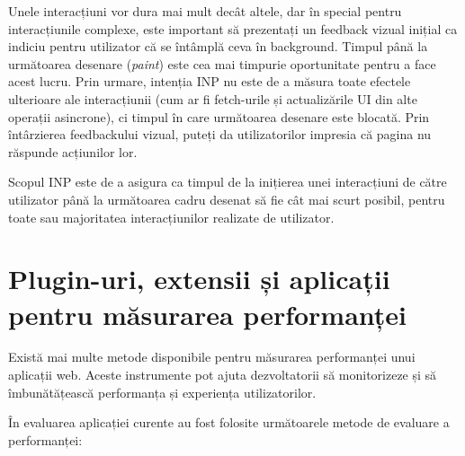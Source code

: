 \documentclass[12pt, a4paper]{report}
\begin{document}
\begin{itemize}
	      Unele interacțiuni vor dura mai mult decât altele, dar în special pentru interacțiunile complexe, este important să prezentați un feedback vizual inițial ca indiciu pentru utilizator că se întâmplă ceva în background. Timpul până la următoarea desenare (\emph{paint}) este cea mai timpurie oportunitate pentru a face acest lucru. Prin urmare, intenția INP nu este de a măsura toate efectele ulterioare ale interacțiunii (cum ar fi fetch-urile și actualizările UI din alte operații asincrone), ci timpul în care următoarea desenare este blocată. Prin întârzierea feedbackului vizual, puteți da utilizatorilor impresia că pagina nu răspunde acțiunilor lor.

	      Scopul INP este de a asigura ca timpul de la inițierea unei interacțiuni de către utilizator până la următoarea cadru desenat să fie cât mai scurt posibil, pentru toate sau majoritatea interacțiunilor realizate de utilizator.
\end{itemize}

\section{Plugin-uri, extensii și aplicații pentru măsurarea performanței}

Există mai multe metode disponibile pentru măsurarea performanței unui aplicații web. Aceste instrumente pot ajuta dezvoltatorii să monitorizeze și să îmbunătățească performanța și experiența utilizatorilor.

În evaluarea aplicației curente au fost folosite următoarele metode de evaluare a performanței:
\end{document}
